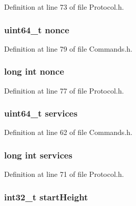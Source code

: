 Definition at line 73 of file Protocol.h.

\hypertarget{struct_cmd_version_af602af589d5bc1af695356386bcb32a9}{
\subsubsection[{nonce}]{\setlength{\rightskip}{0pt plus 5cm}uint64\_\-t {\bf nonce}}}
\label{struct_cmd_version_af602af589d5bc1af695356386bcb32a9}


Definition at line 79 of file Commands.h.

\hypertarget{struct_cmd_version_ab0c4e6e9b4c0db0818ba6121afe137a9}{
\subsubsection[{nonce}]{\setlength{\rightskip}{0pt plus 5cm}long int {\bf nonce}}}
\label{struct_cmd_version_ab0c4e6e9b4c0db0818ba6121afe137a9}


Definition at line 77 of file Protocol.h.

\hypertarget{struct_cmd_version_a8361260b2ca75771b8da0333191db456}{
\subsubsection[{services}]{\setlength{\rightskip}{0pt plus 5cm}uint64\_\-t {\bf services}}}
\label{struct_cmd_version_a8361260b2ca75771b8da0333191db456}


Definition at line 62 of file Commands.h.

\hypertarget{struct_cmd_version_a7c2c2697560cb0d08fdca3bd4d10d07e}{
\subsubsection[{services}]{\setlength{\rightskip}{0pt plus 5cm}long int {\bf services}}}
\label{struct_cmd_version_a7c2c2697560cb0d08fdca3bd4d10d07e}


Definition at line 71 of file Protocol.h.

\hypertarget{struct_cmd_version_a75434fa1cfbff59d821bd10ba0cb6df1}{
\subsubsection[{startHeight}]{\setlength{\rightskip}{0pt plus 5cm}int32\_\-t {\bf startHeight}}}
\label{struct_cmd_version_a75434fa1cfbff59d821bd10ba0cb6df1}


